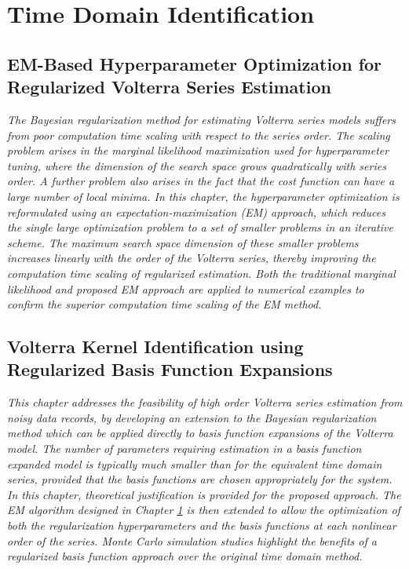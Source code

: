 \documentclass[11pt,twoside]{report}
\begin{document}
\cleardoublepage
\part{Time Domain Identification}
\label{part:TD}

\cleardoublepage
\chapter{EM-Based Hyperparameter Optimization for Regularized Volterra Series Estimation}
\label{chap:4}
\emph{The Bayesian regularization method for estimating Volterra series models suffers from poor computation time scaling with respect to the series order. The scaling problem arises in the marginal likelihood maximization used for hyperparameter tuning, where the dimension of the search space grows quadratically with series order. A further problem also arises in the fact that the cost function can have a large number of local minima. In this chapter, the hyperparameter optimization is reformulated using an expectation-maximization (EM) approach, which reduces the single large optimization problem to a set of smaller problems in an iterative scheme. The maximum search space dimension of these smaller problems increases linearly with the order of the Volterra series, thereby improving the computation time scaling of regularized estimation. Both the traditional marginal likelihood and proposed EM approach are applied to numerical examples to confirm the superior computation time scaling of the EM method.}
\newpage


\cleardoublepage
\chapter{Volterra Kernel Identification using Regularized Basis Function Expansions}
\label{chap:5}
\emph{This chapter addresses the feasibility of high order Volterra series estimation from noisy data records, by developing an extension to the Bayesian regularization method which can be applied directly to basis function expansions of the Volterra model. The number of parameters requiring estimation in a basis function expanded model is typically much smaller than for the equivalent time domain series, provided that the basis functions are chosen appropriately for the system. In this chapter, theoretical justification is provided for the proposed approach. The EM algorithm designed in Chapter \ref{chap:4} is then extended to allow the optimization of both the regularization hyperparameters and the basis functions at each nonlinear order of the series. Monte Carlo simulation studies highlight the benefits of a regularized basis function approach over the original time domain method.}
\newpage

\end{document}
